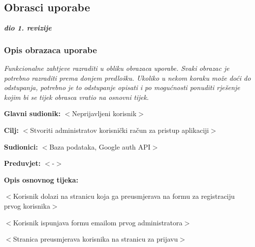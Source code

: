 			\eject 
			


			\subsection{Obrasci uporabe}
				
				\textbf{\textit{dio 1. revizije}}
				
				\subsubsection{Opis obrazaca uporabe}
					\textit{Funkcionalne zahtjeve razraditi u obliku obrazaca uporabe. Svaki obrazac je potrebno razraditi prema donjem predlošku. Ukoliko u nekom koraku može doći do odstupanja, potrebno je to odstupanje opisati i po mogućnosti ponuditi rješenje kojim bi se tijek obrasca vratio na osnovni tijek.}

					\noindent {}
					\begin{packed_item}

						\item \textbf{Glavni sudionik:} $<$Neprijavljeni korisnik$>$
						\item \textbf{Cilj:} $<$Stvoriti administratov korisnički račun za pristup aplikaciji$>$
						\item \textbf{Sudionici:} $<$Baza podataka, Google auth API$>$
						\item \textbf{Preduvjet:} $<$-$>$
						\item \textbf{Opis osnovnog tijeka:}

						\item[] \begin{packed_enum}

							\item $<$Korisnik dolazi na stranicu koja ga preusmjerava na formu za registraciju prvog korisnika$>$
							\item $<$Korisnik ispunjava formu emailom prvog administratora$>$
							\item $<$Stranica preusmjerava korisnika na stranicu za prijavu$>$
						\end{packed_enum}
					\end{packed_item}

